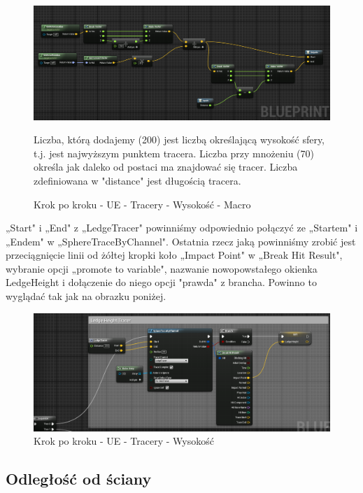 \documentclass[12pt]{xmgr}
\begin{document}
\begin{figure}[!htb]
    \begin{center}
    \includegraphics[scale=0.4]{Screeny/UeKrokPoKroku/UE-HeightMacro}
    \end{center}
    \caption{Krok po kroku - UE - Tracery - Wysokość - Macro}
    Liczba, którą dodajemy (200) jest liczbą określającą wysokość sfery, t.j. jest najwyższym punktem tracera. Liczba przy mnożeniu (70) określa jak daleko od postaci ma znajdować się tracer. Liczba zdefiniowana w "distance" jest długością tracera.
\end{figure}
\newpage
„Start" i „End" z „LedgeTracer" powinniśmy odpowiednio połączyć ze „Startem" i „Endem" w „SphereTraceByChannel". Ostatnia rzecz jaką powinniśmy zrobić jest przeciągnięcie linii od żółtej kropki koło „Impact Point" w „Break Hit Result", wybranie opcji „promote to variable", nazwanie nowopowstałego okienka LedgeHeight i dołączenie do niego opcji "prawda" z brancha. Powinno to wyglądać tak jak na obrazku poniżej.

\begin{figure}[!htb]
    \begin{center}
    \includegraphics[scale=0.5]{Screeny/UeKrokPoKroku/UE-Height}
    \end{center}
    \caption{Krok po kroku - UE - Tracery - Wysokość}
\end{figure}
\newpage
\subsection{Odległość od ściany}
\end{document}
